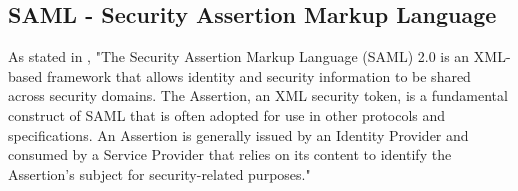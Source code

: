 
\subsection{SAML - Security Assertion Markup Language}
As stated in \cite{ietf_SAML}, "The Security Assertion Markup Language (\Gls{SAML}) 2.0 is an XML-based framework that allows identity and security information to be shared across security domains. The Assertion, an XML security token, is a fundamental construct of \Gls{SAML} that is often adopted for use in other protocols and specifications. An Assertion is generally issued by an Identity Provider and consumed by a Service Provider that relies on its content to identify the Assertion's subject for security-related purposes."





